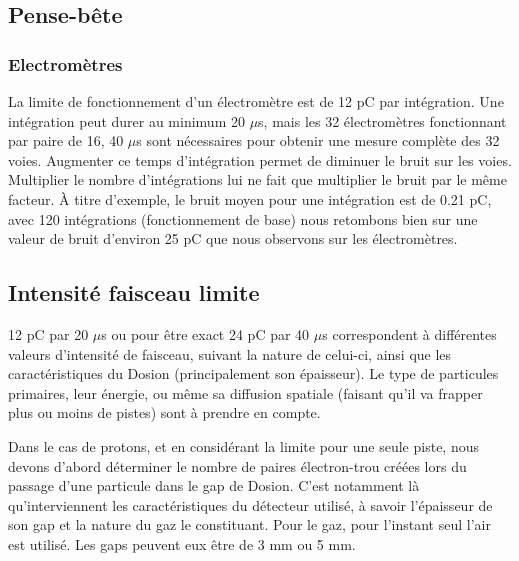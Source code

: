 \documentclass[a4paper,11pt]{article}
\begin{document}
\setmarginsrb{3.5cm}{1.5cm}{1.5cm}{2cm}{2ex}{3ex}{2ex}{5ex}
%
\lhead[]{}
\fancyfoot[C]{}
\fancyfoot[R]{\thepage}

\begin{center}
\subsection*{Pense-bête}
\end{center}

\subsubsection*{Electromètres}
La limite de fonctionnement d'un électromètre est de 12 pC par intégration. 
Une intégration peut durer au minimum 20 $\mu$s, mais les 32 électromètres fonctionnant par paire de 16, 40 $\mu$s sont nécessaires pour obtenir une mesure complète des 32 voies.
Augmenter ce temps d'intégration permet de diminuer le bruit sur les voies.
Multiplier le nombre d'intégrations lui ne fait que multiplier le bruit par le même facteur. 
\`A titre d'exemple, le bruit moyen pour une intégration est de 0.21 pC, avec 120 intégrations (fonctionnement de base) nous retombons bien sur une valeur de bruit d'environ 25 pC que nous observons sur les électromètres.

\subsection*{Intensité faisceau limite}
12 pC par 20 $\mu$s ou pour être exact 24 pC par 40 $\mu$s correspondent à différentes valeurs d'intensité de faisceau, suivant la nature de celui-ci, ainsi que les caractéristiques du Dosion (principalement son épaisseur).
Le type de particules primaires, leur énergie, ou même sa diffusion spatiale (faisant qu'il va frapper plus ou moins de pistes) sont à prendre en compte.

Dans le cas de protons, et en considérant la limite pour une seule piste, nous devons d'abord déterminer le nombre de paires électron-trou créées lors du passage d'une particule dans le gap de Dosion.
C'est notamment là qu'interviennent les caractéristiques du détecteur utilisé, à savoir l'épaisseur de son gap et la nature du gaz le constituant.
Pour le gaz, pour l'instant seul l'air est utilisé. 
Les gaps peuvent eux être de 3 mm ou 5 mm.
\end{document}
